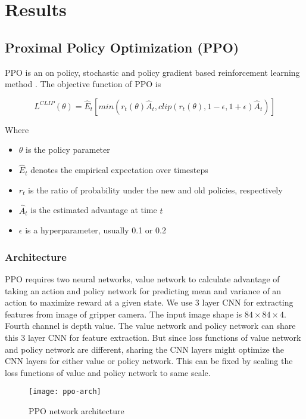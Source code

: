 \chapter{Results}

\section{Proximal Policy Optimization (PPO)}

PPO is an on policy, stochastic and policy gradient based reinforcement learning method \cite{ppo}. The objective function of PPO is 

\begin{equation}
L^{CLIP} (\theta) = \hat{E}_t \left[ min(r_t(\theta) \hat{A}_t, clip(r_t(\theta), 1 - \epsilon, 1 + \epsilon) \hat{A}_t) \right]
\end{equation}

Where
\begin{itemize}
	\item $\theta$ is the policy parameter
	\item $\hat{E}_t$ denotes the empirical expectation over timesteps
	\item $r_t$ is the ratio of probability under the new and old policies, respectively
	\item $\hat{A}_t$ is the estimated advantage at time $t$
	\item $\epsilon$ is a hyperparameter, usually 0.1 or 0.2
\end{itemize}

\subsection{Architecture}
PPO requires two neural networks, value network to calculate advantage of taking an action and policy network for predicting mean and variance of an action to maximize reward at a given state. We use 3 layer CNN for extracting features from image of gripper camera. The input image shape is $84 \times 84 \times 4$. Fourth channel is depth value. The value network and policy network can share this 3 layer CNN for feature extraction. But since loss functions of value network and policy network are different, sharing the CNN layers might optimize the CNN layers for either value or policy network. This can be fixed by scaling the loss functions of value and policy network to same scale.

\begin{figure}[H]
	\centering
	\texttt{[image: ppo-arch]}
	\caption{PPO network architecture}
\end{figure}

